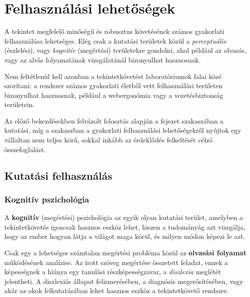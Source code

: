 \chapter{Felhasználási lehetőségek}\label{sect:felhasznalas}

A tekintet megfelelő minőségű és robusztus követésének számos gyakorlati felhasználása lehetséges. Elég csak a kutatási területek közül a \emph{perceptuális} (észlelési), vagy \emph{kognitív} (megértési) területekre gondolni, ahol például az olvasás, vagy az alvás folyamatának vizsgálatánál bizonyulhat hasznosnak.

Nem feltétlenül kell azonban a tekintetkövetést laboratóriumok falai közé szorítani: a rendszer számos gyakorlati életből vett felhasználási területen bizonyulhat hasznosnak, például a webergonómia vagy a vezetésbiztonság területein.

\bigskip

Az előző bekezdésekben felvázolt felosztás alapján a fejezet  szakaszában a kutatási, míg a  szakaszban a gyakorlati felhasználási lehetőségekről nyújtok egy vállaltan nem teljes körű, sokkal inkább az érdeklődés felkeltését célzó összefoglalást.

\section{Kutatási felhasználás}\label{sect:tudomanyos}

\subsection{Kognitív pszichológia}\label{sect:kognitiv}

A \textbf{kognitív} (megértési) pszichológia az egyik olyan kutatási terület, amelyben a tekintetkövetés igencsak hasznos eszköz lehet, hiszen a tudományág azt vizsgálja, hogy az ember hogyan látja a világot maga körül, és milyen módon képezi le azt.

\bigskip

Csak egy a lehetséges számtalan megértési probléma közül az \textbf{olvasási folyamat} működésének analízise. Az írott szöveg megértése összetett feladat, ennek a képességnek a hiánya egy tanulási részképességzavar, a \emph{diszlexia} meglétét jelentheti. A diszlexiás állapot felismerésében, a diagnózis megerősítésében, vagy akár az okok felkutatásában lehet hasznos eszköz a tekintetkövető rendszer.

